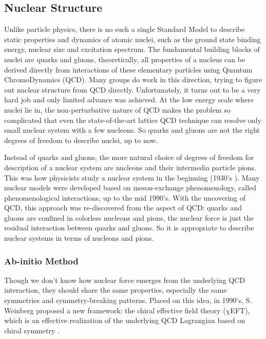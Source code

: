 \subsection{Nuclear Structure}
\begin{comment}
    QCD ==> EFT ==> Interactions ==> ab-initio ==> shell model ==> DFT
\end{comment}
Unlike particle physics, there is no such a single Standard Model to describe
static properties and dynamics of atomic nuclei, such as the ground state binding energy,
nuclear size and excitation spectrum. 
The fundamental building blocks of nuclei are quarks and gluons, theoretically, 
all properties of a nucleus can be derived directly from interactions
of these elementary particles using Quantum ChromoDynamics (QCD). 
Many groups do work in this direction, trying to figure out nuclear structure from QCD 
directly. Unfortunately, it turns out to be a very hard job and only limited advance
was achieved. At the low energy scale where nuclei lie in, the non-perturbative nature of 
QCD makes the problem so complicated that even the state-of-the-art lattice QCD
technique can resolve only small nuclear system with a few nucleons.
So quarks and gluons are not the right degrees of freedom to describe nuclei, up
to now.

Instead of quarks and gluons, the more natural choice of degrees of freedom for
description of a nuclear system are nucleons and their intermedia particle pions.
This was how physicists study a nuclear system in the beginning (1930's \cite{10.1143/PTPS.1.1,}). 
Many nuclear models were developed based on meson-exchange phenomenology, called
phenomenological interactions, up to the mid 1990's.
With the uncovering of QCD, this approach was re-discovered from the aspect of QCD:
quarks and gluons are confined in colorless nucleons and pions, the nuclear force
is just the residual interaction between quarks and gluons. So it is appropriate
to describe nuclear systems in terms of nucleons and pions.

\subsubsection{Ab-initio Method}
Though we don't know how nuclear force emerges from the underlying QCD interaction,
they should share the same properties, especially the same symmetries and symmetry-breaking
patterns. %
Placed on this idea, in 1990's, S. Weinberg proposed a new framework: the chiral 
effective field theory ($\chi$EFT), which is an effective realization of the 
underlying QCD Lagrangian based on chiral symmetry \cite{WEINBERG}.

